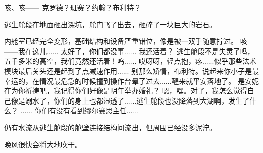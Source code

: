 \documentclass[openany]{book}
\begin{document}
\begin{dialogue}
     咳、咳——
     克罗德？班赛？约翰？布利特？\par
    逃生舱段在地面砸出深坑，舱门飞了出去，砸碎了一块巨大的岩石。\par
    内舱室已经完全变形，基础结构和设备严重错位，像是被一双手随意拧过。
     咳——我在这儿......
     太好了，你们都没事......
     我还活着？
     逃生舱段不是失灵了吗，五千多米的高空，我们竟然还活着！呜......
     哎呀呀，轻点抱，疼......似乎那些法术模块最后关头还是起到了点减速作用......
     别那么矫情，布利特。说起来你小子是最幸运的，在情况最危急的时候撞到操作台晕了过去......醒来就平安落地了。
     是安妮在为你祈祷吧，我记得你们好像是明年举办婚礼？
     嗯，嘿。对了，我怎么觉得自己像是溺水了，你们的身上也都湿透了......逃生舱段也没降落到大湖啊，发生了什么？
     ......
     你们有没有看到缪尔赛思主任......
\end{dialogue}\par

仍有水流从逃生舱段的舱壁连接结构间流出，但周围已经没多泥泞。\par
晚风很快会将大地吹干。
\end{document}
